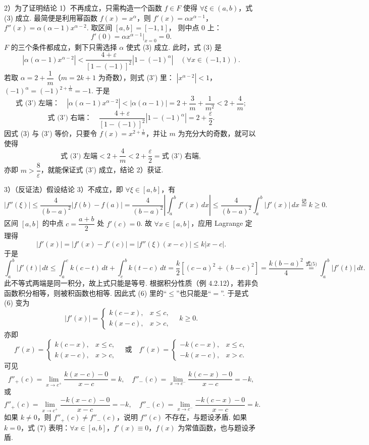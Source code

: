 \documentclass[UTF8, 12pt, fontset=fandol, oneside]{ctexart}
\begin{document}
2）为了证明结论 1）不再成立，只需构造一个函数 $f\in F$ 使得 $\forall \xi\in(a,b)$，式 (3) 成立.
最简便是利用幂函数 $f(x)=x^\alpha$，则 $f'(x)=\alpha x^{\alpha-1}$，
$f''(x)=\alpha(\alpha-1)x^{\alpha-2}$. 取区间 $[a,b]=[-1,1]$，
则中点 $0$ 上：
\[
f'(0)=\alpha x^{\alpha-1}\big|_{x=0}=0.
\]
$F$ 的三个条件都成立，剩下只需选择 $\alpha$ 使式 (3) 成立. 此时，式 (3) 是
\[
|\alpha(\alpha-1)x^{\alpha-2}|
<\frac{4+\varepsilon}{[1-(-1)]^2}|1-(-1)^\alpha|
\quad(\forall x\in(-1,1)). \tag{3'}
\]
若取 $\alpha=2+\dfrac1m$（$m=2k+1$ 为奇数），则式 (3') 里：
$|x^{\alpha-2}|<1$，$(-1)^\alpha=(-1)^{2+\frac1m}=-1$. 于是
\[
\text{式 (3') 左端：}\quad
|\alpha(\alpha-1)x^{\alpha-2}|<|\alpha(\alpha-1)|
=2+\frac3m+\frac1{m^2}<2+\frac4m;
\]
\[
\text{式 (3') 右端：}\quad
\frac{4+\varepsilon}{[1-(-1)]^2}|1-(-1)^\alpha|
=2+\frac\varepsilon2.
\]
因式 (3) 与 (3') 等价，只要令 $f(x)=x^{2+\frac1m}$，并让 $m$ 为充分大的奇数，就可以使得
\[
\text{式 (3') 左端}<2+\frac4m<2+\frac\varepsilon2=\text{式 (3') 右端},
\]
亦即 $m>\dfrac8\varepsilon$，就能保证式 (3') 成立，结论 2）获证.

3）（反证法）假设结论 3）不成立，即 $\forall \xi\in[a,b]$，有
\[
|f''(\xi)|\le \frac4{(b-a)^2}|f(b)-f(a)|
=\frac4{(b-a)^2}\left|\int_a^b f'(x)\,dx\right|
\le \frac4{(b-a)^2}\int_a^b |f'(x)|\,dx
\stackrel{\text{记}}{=} k\ge0. \tag{5}
\]
区间 $[a,b]$ 的中点 $c=\dfrac{a+b}{2}$ 处 $f'(c)=0$. 故 $\forall x\in[a,b]$，应用 Lagrange 定理得
\[
|f'(x)|=|f'(x)-f'(c)|=|f''(\xi)(x-c)|\le k|x-c|. \tag{6}
\]
于是
\[
\int_a^b |f'(t)|\,dt
\le \int_a^c k(c-t)\,dt+\int_c^b k(t-c)\,dt
=\frac k2[(c-a)^2+(b-c)^2]
=\frac{k(b-a)^2}{4}
\stackrel{\text{式(5)}}{=}\int_a^b |f'(t)|\,dt.
\]
此不等式两端是同一积分，故上式只能是等号. 根据积分性质（例 4.2.12），若非负函数积分相等，则被积函数也相等.
因此式 (6) 里的“$\le$”也只能是“$=$”. 于是式 (6) 变为
\[
|f'(x)|=
\begin{cases}
k(c-x),&x\le c,\\
k(x-c),&x>c,
\end{cases}
\quad k\ge0. \tag{7}
\]
亦即
\[
f'(x)=
\begin{cases}
k(c-x),&x\le c,\\
k(x-c),&x>c,
\end{cases}
\quad\text{或}\quad
f'(x)=
\begin{cases}
-k(c-x),&x\le c,\\
-k(x-c),&x>c.
\end{cases}
\]
可见
\[
f''_+(c)=\lim_{x\to c^+}\frac{k(x-c)-0}{x-c}=k,\quad
f''_-(c)=\lim_{x\to c^-}\frac{k(c-x)-0}{x-c}=-k,
\]
或
\[
f''_+(c)=\lim_{x\to c^+}\frac{-k(x-c)-0}{x-c}=-k,\quad
f''_-(c)=\lim_{x\to c^-}\frac{-k(c-x)-0}{x-c}=k.
\]
如果 $k\ne0$，则 $f''_+(c)\ne f''_-(c)$，说明 $f''(c)$ 不存在，与题设矛盾.
如果 $k=0$，式 (7) 表明：$\forall x\in[a,b]$，$f'(x)\equiv0$，$f(x)$ 为常值函数，也与题设矛盾.
\end{document}
